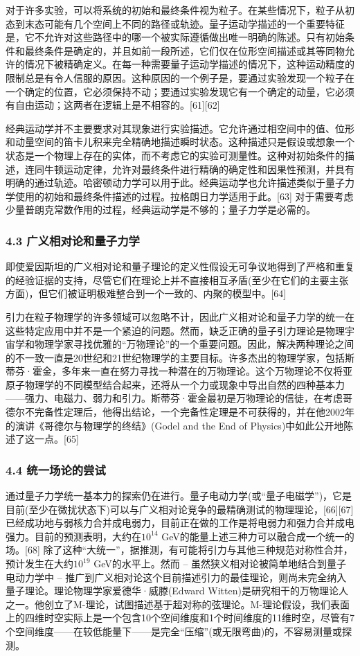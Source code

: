 对于许多实验，可以将系统的初始和最终条件视为粒子。在某些情况下，粒子从初态到末态可能有几个空间上不同的路径或轨迹。量子运动学描述的一个重要特征是，它不允许对这些路径中的哪一个被实际遵循做出唯一明确的陈述。只有初始条件和最终条件是确定的，并且如前一段所述，它们仅在位形空间描述或其等同物允许的情况下被精确定义。在每一种需要量子运动学描述的情况下，这种运动精度的限制总是有令人信服的原因。这种原因的一个例子是，要通过实验发现一个粒子在一个确定的位置，它必须保持不动；要通过实验发现它有一个确定的动量，它必须有自由运动；这两者在逻辑上是不相容的。[61][62]

经典运动学并不主要要求对其现象进行实验描述。它允许通过相空间中的值、位形和动量空间的笛卡儿积来完全精确地描述瞬时状态。这种描述只是假设或想象一个状态是一个物理上存在的实体，而不考虑它的实验可测量性。这种对初始条件的描述，连同牛顿运动定律，允许对最终条件进行精确的确定性和因果性预测，并具有明确的通过轨迹。哈密顿动力学可以用于此。经典运动学也允许描述类似于量子力学使用的初始和最终条件描述的过程。拉格朗日力学适用于此。[63] 对于需要考虑少量普朗克常数作用的过程，经典运动学是不够的；量子力学是必需的。

\subsubsection{4.3 广义相对论和量子力学}
即使爱因斯坦的广义相对论和量子理论的定义性假设无可争议地得到了严格和重复的经验证据的支持，尽管它们在理论上并不直接相互矛盾(至少在它们的主要主张方面)，但它们被证明极难整合到一个一致的、内聚的模型中。[64]

引力在粒子物理学的许多领域可以忽略不计，因此广义相对论和量子力学的统一在这些特定应用中并不是一个紧迫的问题。然而，缺乏正确的量子引力理论是物理宇宙学和物理学家寻找优雅的“万物理论”的一个重要问题。因此，解决两种理论之间的不一致一直是20世纪和21世纪物理学的主要目标。许多杰出的物理学家，包括斯蒂芬·霍金，多年来一直在努力寻找一种潜在的万物理论。这个万物理论不仅将亚原子物理学的不同模型结合起来，还将从一个力或现象中导出自然的四种基本力——强力、电磁力、弱力和引力。斯蒂芬·霍金最初是万物理论的信徒，在考虑哥德尔不完备性定理后，他得出结论，一个完备性定理是不可获得的，并在他2002年的演讲《哥德尔与物理学的终结》(Godel and the End of Physics)中如此公开地陈述了这一点。[65]

\subsubsection{4.4 统一场论的尝试}
通过量子力学统一基本力的探索仍在进行。量子电动力学(或“量子电磁学”)，它是目前(至少在微扰状态下)可以与广义相对论竞争的最精确测试的物理理论，[66][67] 已经成功地与弱核力合并成电弱力，目前正在做的工作是将电弱力和强力合并成电强力。目前的预测表明，大约在$10^{14}$ GeV的能量上述三种力可以融合成一个统一的场。[68] 除了这种“大统一”，据推测，有可能将引力与其他三种规范对称性合并，预计发生在大约$10^{19}$ GeV的水平上。然而  – 虽然狭义相对论被简单地结合到量子电动力学中  – 推广到广义相对论这个目前描述引力的最佳理论，则尚未完全纳入量子理论。理论物理学家爱德华·威滕(Edward Witten)是研究相干的万物理论人之一。他创立了M-理论，试图描述基于超对称的弦理论。M-理论假设，我们表面上的四维时空实际上是一个包含10个空间维度和1个时间维度的11维时空，尽管有7个空间维度——在较低能量下——是完全“压缩”(或无限弯曲)的，不容易测量或探测。

